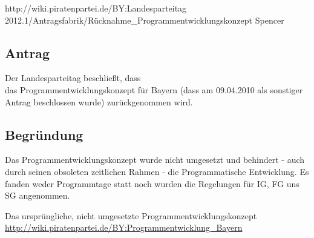 {http://wiki.piratenpartei.de/BY:Landesparteitag 2012.1/Antragsfabrik/Rücknahme_Programmentwicklungskonzept}
{Spencer}
\subsection{Antrag}
Der Landesparteitag beschließt, dass\\
das Programmentwicklungskonzept für Bayern (dass am 09.04.2010 als sonstiger Antrag
beschlossen wurde) zurückgenommen wird.
\subsection{Begründung}
Das Programmentwicklungskonzept wurde nicht umgesetzt und behindert - auch durch seinen
obsoleten zeitlichen Rahmen - die Programmatische Entwicklung. Es fanden weder Programmtage
statt noch wurden die Regelungen für IG, FG uns SG angenommen.\par
Das ursprüngliche, nicht umgesetzte Programmentwicklungskonzept
\url{http://wiki.piratenpartei.de/BY:Programmentwicklung_Bayern}
